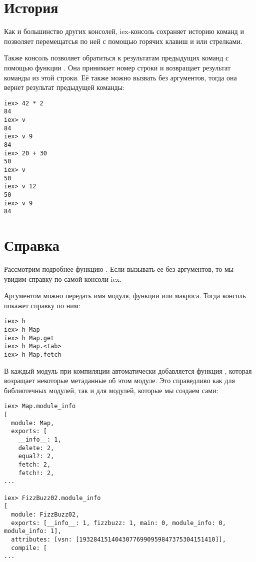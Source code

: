 \section{История}

Как и большинство других консолей, iex-консоль сохраняет историю команд и позволяет перемещатсья по ней с помощью горячих клавиш  и  или стрелками.

Также консоль позволяет обратиться к результатам предыдущих команд с помощью функции . Она принимает номер строки и возвращает результат команды из этой строки. Её также можно вызвать без аргументов, тогда она вернет результат предыдущей команды:

\begin{lstlisting}[language=ElixirShell, style=elixir-shell]
iex> 42 * 2
84
iex> v
84
iex> v 9
84
iex> 20 + 30
50
iex> v
50
iex> v 12
50
iex> v 9
84
\end{lstlisting}

\section{Справка}

Рассмотрим подробнее функцию . Если вызывать ее без аргументов, то мы увидим справку по самой консоли iex.

Аргументом можно передать имя модуля, функции или макроса. Тогда консоль покажет справку по ним:
\begin{lstlisting}[language=ElixirShell, style=elixir-shell]
iex> h
iex> h Map
iex> h Map.get
iex> h Map.<tab>
iex> h Map.fetch
\end{lstlisting}

В каждый модуль при компиляции автоматически добавляется функция , которая возращает некоторые метаданные об этом модуле. Это справедливо как для библиотечных модулей, так и для модулей, которые мы создаем сами:

\begin{lstlisting}[language=ElixirShell, style=elixir-shell]
iex> Map.module_info
[
  module: Map,
  exports: [
    __info__: 1,
    delete: 2,
    equal?: 2,
    fetch: 2,
    fetch!: 2,
...

iex> FizzBuzz02.module_info
[
  module: FizzBuzz02,
  exports: [__info__: 1, fizzbuzz: 1, main: 0, module_info: 0, module_info: 1],
  attributes: [vsn: [19328415140430776990959847375304151410]],
  compile: [
...
\end{lstlisting}


